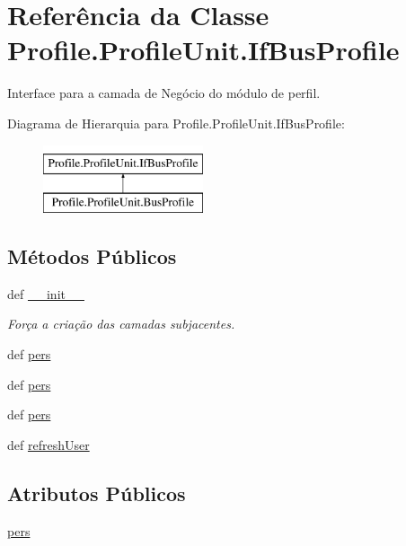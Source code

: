 \hypertarget{classProfile_1_1ProfileUnit_1_1IfBusProfile}{\section{Referência da Classe Profile.\-Profile\-Unit.\-If\-Bus\-Profile}
\label{classProfile_1_1ProfileUnit_1_1IfBusProfile}
}


Interface para a camada de Negócio do módulo de perfil.  


Diagrama de Hierarquia para Profile.\-Profile\-Unit.\-If\-Bus\-Profile\-:\begin{figure}[H]
\begin{center}
\leavevmode
\includegraphics[height=2.000000cm]{dc/d47/classProfile_1_1ProfileUnit_1_1IfBusProfile}
\end{center}
\end{figure}
\subsection*{Métodos Públicos}
\begin{DoxyCompactItemize}
\item 
def \hyperlink{classProfile_1_1ProfileUnit_1_1IfBusProfile_a3c02bbff4cb54b40edab64d0f9b86a59}{\-\_\-\-\_\-init\-\_\-\-\_\-}
\begin{DoxyCompactList}\small\item\em Força a criação das camadas subjacentes. \end{DoxyCompactList}\item 
def \hyperlink{classProfile_1_1ProfileUnit_1_1IfBusProfile_a996592f4b01e0540f45d042065d5a7f4}{pers}
\item 
def \hyperlink{classProfile_1_1ProfileUnit_1_1IfBusProfile_a996592f4b01e0540f45d042065d5a7f4}{pers}
\item 
def \hyperlink{classProfile_1_1ProfileUnit_1_1IfBusProfile_a996592f4b01e0540f45d042065d5a7f4}{pers}
\item 
def \hyperlink{classProfile_1_1ProfileUnit_1_1IfBusProfile_abe42ebac800e9dcd762e9d73b4a5f9b8}{refresh\-User}
\end{DoxyCompactItemize}
\subsection*{Atributos Públicos}
\begin{DoxyCompactItemize}
\item 
\hyperlink{classProfile_1_1ProfileUnit_1_1IfBusProfile_abe265adaf3fd39d6534f9ad4c9ba8abb}{pers}
\end{DoxyCompactItemize}


